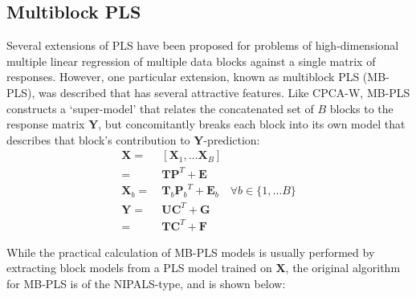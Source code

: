 \subsection{Multiblock PLS}

\begin{doublespace}
Several extensions of PLS \cite{westerhuis:jchemo1998} have been proposed for
problems of high-dimensional multiple linear regression of multiple data
blocks against a single matrix of responses. However, one particular extension,
known as multiblock PLS (MB-PLS), was described \cite{westerhuis:jchemo1997}
that has several attractive features. Like CPCA-W, MB-PLS constructs a
`super-model' that relates the concatenated set of $B$ blocks to the response
matrix $\mathbf{Y}$, but concomitantly breaks each block into its own model
that describes that block's contribution to $\mathbf{Y}$-prediction:
\begin{align}
\mathbf{X} =& \: [\mathbf{X}_1, \dots \mathbf{X}_B] \\
           =& \: \mathbf{T} \mathbf{P}^T + \mathbf{E} \\
\mathbf{X}_b =& \: \mathbf{T}_b {\mathbf{P}_b}^T + \mathbf{E}_b
 \quad \forall b \in \{1, \dots B\} \\
\mathbf{Y} =& \: \mathbf{U} \mathbf{C}^T + \mathbf{G} \\
           =& \: \mathbf{T} \mathbf{C}^T + \mathbf{F} \nonumber
\end{align}

While the practical calculation of MB-PLS models is usually performed by
extracting block models from a PLS model trained on $\mathbf{X}$, the
original algorithm for MB-PLS is of the NIPALS-type, and is shown below:
\end{doublespace}

